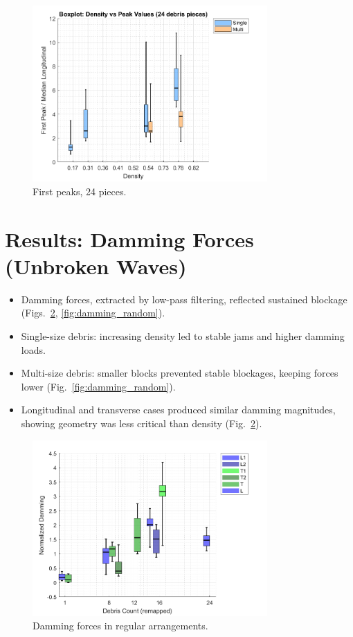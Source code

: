 \documentclass{article}
\begin{document}
\begin{figure}[htbp]
    \centering
    \includegraphics[width=0.8\textwidth]{Boxplot_Density_vs_PeakValues_24Debris.png}
    \caption{First peaks, 24 pieces.}
    \label{fig:boxplot_24}
\end{figure}

\section{Results: Damming Forces (Unbroken Waves)}
\begin{itemize}
    \item Damming forces, extracted by low-pass filtering, reflected sustained blockage (Figs.~\ref{fig:damming_regular_remap}, \ref{fig:damming_random}).
    \item Single-size debris: increasing density led to stable jams and higher damming loads.
    \item Multi-size debris: smaller blocks prevented stable blockages, keeping forces lower (Fig.~\ref{fig:damming_random}).
    \item Longitudinal and transverse cases produced similar damming magnitudes, showing geometry was less critical than density (Fig.~\ref{fig:damming_regular_remap}).
\end{itemize}

\begin{figure}[htbp]
    \centering
    \includegraphics[width=0.8\textwidth]{Damming_Regular_L_T_SplitByTrial_Remapped.png}
    \caption{Damming forces in regular arrangements.}
    \label{fig:damming_regular_remap}
\end{figure}
\end{document}
